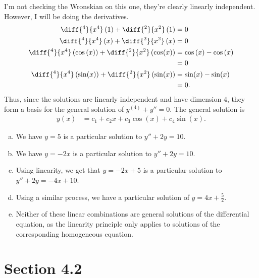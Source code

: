 \documentclass[10pt]{mypackage}
\begin{document}
\begin{solution}[Problem 30]
  I'm not checking the Wronskian on this one, they're clearly linearly independent. However, I will be doing the derivatives.
  \begin{align*}
    \diff{^4}{x^4}\left(1\right) + \diff{^2}{x^2}\left(1\right) &= 0\\
    \diff{^4}{x^4}\left(x\right) + \diff{^2}{x^2}\left(x\right) &= 0\\
    \diff{^4}{x^4}\left(\cos\left(x\right)\right) + \diff{^2}{x^2}\left(\cos(x)\right) &= \cos\left(x\right) - \cos\left(x\right)\\
                                                                                       &= 0\\
    \diff{^4}{x^4}\left(\sin(x)\right) + \diff{^2}{x^2}\left(\sin(x)\right) &= \sin(x) - \sin(x)\\
                                                                            &= 0.
  \end{align*}
  Thus, since the solutions are linearly independent and have dimension $4$, they form a basis for the general solution of $y^{(4)} + y'' = 0$. The general solution is
  \begin{align*}
    y(x) &= c_1 + c_2x + c_3\cos(x) + c_4\sin(x).
  \end{align*}
\end{solution}
\begin{solution}[Problem 36]\hfill
  \begin{enumerate}[(a)]
    \item We have $y=5$ is a particular solution to $y'' + 2y = 10$.
    \item We have $y=-2x$ is a particular solution to $y'' + 2y = 10$.
    \item Using linearity, we get that $y = -2x + 5$ is a particular solution to $y'' + 2y = -4x + 10$.
    \item Using a similar process, we have a particular solution of $y = 4x + \frac{5}{2}$.
    \item Neither of these linear combinations are general solutions of the differential equation, as the linearity principle only applies to solutions of the corresponding homogeneous equation.
  \end{enumerate}
\end{solution}
\section{Section 4.2}%
\end{document}
